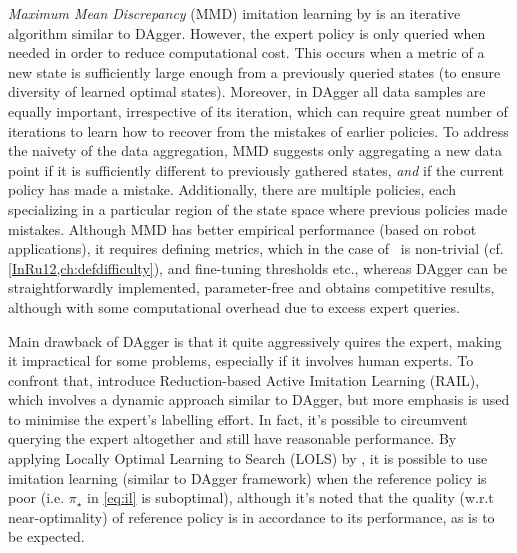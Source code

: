
\emph{Maximum Mean Discrepancy} (MMD) imitation learning by \cite{Kim13} is an 
iterative algorithm similar to DAgger. 
However, the expert policy is only queried when needed in order to reduce 
computational cost. 
This occurs when a metric of a new state is sufficiently large enough from a 
previously queried states (to ensure diversity of learned optimal states). 
Moreover, in DAgger all data samples are equally important, irrespective of its 
iteration, which can require great number of iterations to learn how to recover 
from the mistakes of earlier policies. To address the naivety of the data 
aggregation, MMD suggests only aggregating a new data point 
if it is sufficiently different to previously gathered states, \emph{and} if 
the current policy has made a mistake. 
Additionally, there are multiple policies, each specializing in a particular 
region of the state space where previous policies made mistakes.
Although MMD has better empirical performance (based on robot applications), it 
requires defining metrics, which in the case of \jsp\ is non-trivial (cf. 
\cref{InRu12,ch:defdifficulty}), and fine-tuning thresholds etc., whereas 
DAgger can be straightforwardly implemented, parameter-free and obtains 
competitive results, although with some computational overhead due to excess 
expert queries. 

Main drawback of DAgger is that it quite aggressively quires the expert, making 
it impractical for some problems, especially if it involves human experts. 
To confront that, \cite{Judah12} introduce Reduction-based Active Imitation 
Learning (RAIL), which involves a dynamic approach similar to DAgger, but more 
emphasis is used to minimise the expert's labelling effort.
In fact, it's possible to circumvent querying the expert altogether and still 
have reasonable performance. By applying Locally Optimal Learning to Search 
(LOLS) by \cite{ChangKADL15}, it is possible to use imitation learning (similar to 
DAgger framework) when the reference policy is poor (i.e. $\pi_\star$ in 
\cref{eq:il} is suboptimal), 
although it's noted that the quality (w.r.t near-optimality) of reference 
policy is in accordance to its performance, as is to be expected. 
